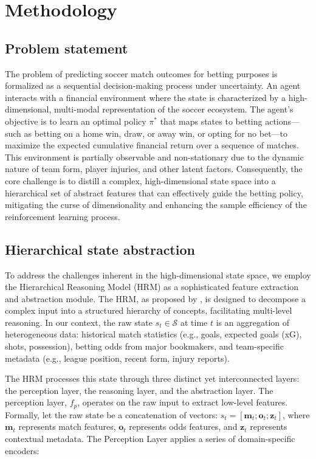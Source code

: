 \documentclass[3p,times,procedia]{elsarticle}
\begin{document}
\section{Methodology} \label{sec:methodology}
\subsection{Problem statement}
The problem of predicting soccer match outcomes for betting purposes is formalized as a sequential decision-making process under uncertainty. An agent interacts with a financial environment where the state is characterized by a high-dimensional, multi-modal representation of the soccer ecosystem. The agent's objective is to learn an optimal policy $\pi^*$ that maps states to betting actions—such as betting on a home win, draw, or away win, or opting for no bet—to maximize the expected cumulative financial return over a sequence of matches. This environment is partially observable and non-stationary due to the dynamic nature of team form, player injuries, and other latent factors. Consequently, the core challenge is to distill a complex, high-dimensional state space into a hierarchical set of abstract features that can effectively guide the betting policy, mitigating the curse of dimensionality and enhancing the sample efficiency of the reinforcement learning process.

\subsection{Hierarchical state abstraction}

To address the challenges inherent in the high-dimensional state space, we employ the Hierarchical Reasoning Model (HRM) as a sophisticated feature extraction and abstraction module. The HRM, as proposed by \cite{wang2025hierarchical}, is designed to decompose a complex input into a structured hierarchy of concepts, facilitating multi-level reasoning. In our context, the raw state $s_t \in \mathcal{S}$ at time $t$ is an aggregation of heterogeneous data: historical match statistics (e.g., goals, expected goals (xG), shots, possession), betting odds from major bookmakers, and team-specific metadata (e.g., league position, recent form, injury reports).

The HRM processes this state through three distinct yet interconnected layers: the perception layer, the reasoning layer, and the abstraction layer. The perception layer, $f_p$, operates on the raw input to extract low-level features. Formally, let the raw state be a concatenation of vectors: $s_t = [\mathbf{m}_t; \mathbf{o}_t; \mathbf{z}_t]$, where $\mathbf{m}_t$ represents match features, $\mathbf{o}_t$ represents odds features, and $\mathbf{z}_t$ represents contextual metadata. The Perception Layer applies a series of domain-specific encoders:
\end{document}
